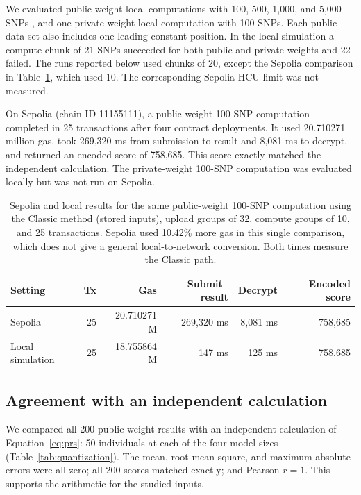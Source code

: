 \documentclass[10pt]{article}
\begin{document}
We evaluated public-weight local computations with 100, 500, 1,000, and 5,000 SNPs
\citep{knight2026heprs}, and one private-weight local computation with 100 SNPs.  Each
public data set also includes one leading constant position.  In the local simulation a
compute chunk of 21 SNPs succeeded for both public and private weights and 22 failed.
The runs reported below used chunks of 20, except the Sepolia comparison in
Table~\ref{tab:live_validation}, which used 10.  The corresponding Sepolia HCU limit was
not measured.

On Sepolia (chain ID 11155111), a public-weight 100-SNP computation completed in 25
transactions after four contract deployments.  It used 20.710271 million gas, took
269,320 ms from submission to result and 8,081 ms to decrypt, and returned an encoded
score of 758,685.  This score exactly matched the independent calculation.  The
private-weight 100-SNP computation was evaluated locally but was not run on Sepolia.

\begin{table}[t]
\centering
\caption{Sepolia and local results for the same public-weight 100-SNP computation using
the Classic method (stored inputs), upload groups of 32, compute groups of 10, and 25
transactions. Sepolia used 10.42\% more gas in this single comparison, which does not give
a general local-to-network conversion. Both times measure the Classic path.}
\label{tab:live_validation}
\small
\begin{tabular}{lrrrrr}
\toprule
\textbf{Setting} & \textbf{Tx} & \textbf{Gas} & \textbf{Submit--result} & \textbf{Decrypt} & \textbf{Encoded score} \\
\midrule
Sepolia & 25 & 20.710271 M & 269,320 ms & 8,081 ms & 758,685 \\
Local simulation & 25 & 18.755864 M & 147 ms & 125 ms & 758,685 \\
\bottomrule
\end{tabular}
\end{table}

\subsection{Agreement with an independent calculation}

We compared all 200 public-weight results with an independent calculation of
Equation~\ref{eq:prs}: 50 individuals at each of the four model sizes
(Table~\ref{tab:quantization}).  The mean,
root-mean-square, and maximum absolute errors were all zero; all 200 scores matched
exactly; and Pearson $r=1$.  This supports the arithmetic for the studied inputs.
\end{document}
